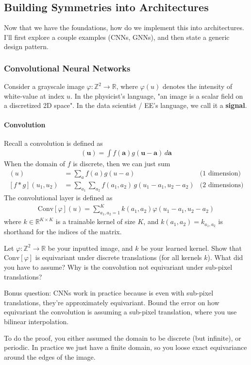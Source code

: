 \subsection{Building Symmetries into Architectures}
Now that we have the foundations, how do we implement this into architectures. I'll first explore a couple examples (CNNs, GNNs), and then state a generic design pattern.

\subsubsection{Convolutional Neural Networks}
Consider a grayscale image $\varphi : \mathbb Z^2 \to \mathbb R$, where $\varphi(u)$ denotes the intensity of white-value at index $u$. In the physicist's language, "an image is a scalar field on a discretized 2D space". In the data scientist / EE's language, we call it a \textbf{signal}.

\paragraph{Convolution}
Recall a convolution is defined as
\begin{align}
	[f * g](\mathbf u) = \int f(\mathbf a) g(\mathbf u - \mathbf a) \, d\mathbf a
\end{align}
When the domain of $f$ is discrete, then we can just sum
\begin{align}
	[f * g](u) & = \sum_a f(a) g(u-a) & \text{(1 dimension)}\\
	[f * g](u_1, u_2)& = \sum_{a_1} \sum_{a_2} f(a_1, a_2) \, g(u_1 - a_1, u_2 - a_2) & \text{(2 dimensions)}
\end{align}
The convolutional layer is defined as
\begin{align}
	\text{Conv}[\varphi](u) = \sum_{a_1,a_2=1}^K k(a_1, a_2) \varphi(u_1 - a_1, u_2 - a_2)
\end{align}
where $k \in \mathbb R^{K \times K}$ is a trainable kernel of size $K$, and $k(a_1, a_2) = k_{a_1,a_2}$ is shorthand for the indices of the matrix. 
\begin{problem}
	Let $\varphi: \mathbb Z^2 \to \mathbb R$ be your inputted image, and $k$ be your learned kernel. Show that $\text{Conv}[\varphi]$ is equivariant under discrete translations (for all kernels $k$). What did you have to assume? Why is the convolution not equivariant under sub-pixel translations?
	
	Bonus question: CNNs work in practice because is even with sub-pixel translations, they're approximately equivariant. Bound the error on how equivariant the convolution is assuming a sub-pixel translation, where you use bilinear interpolation.
\end{problem}
To do the proof, you either assumed the domain to be discrete (but infinite), or periodic. In practice we just have a finite domain, so you loose exact equivariance around the edges of the image.

